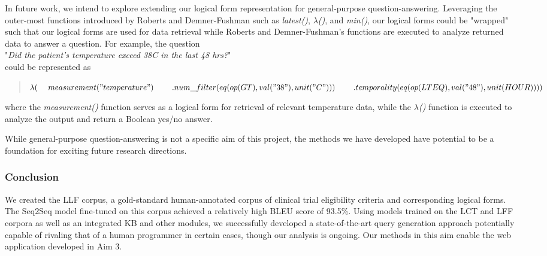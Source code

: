 \documentclass[../main.tex]{subfiles}
\begin{document}
In future work, we intend to explore extending our logical form representation for general-purpose question-answering. Leveraging the outer-most functions introduced by Roberts and Demner-Fushman such as \textit{latest()}, $\lambda$\textit{()}, and \textit{min()}, our logical forms could be "wrapped" such that our logical forms are used for data retrieval while Roberts and Demner-Fushman's functions are executed to analyze returned data to answer a question. For example, the question \\

"\textit{Did the patient’s temperature exceed 38C in the last 48 hrs?}" \\

\noindent could be represented as

\begin{quote}
$\lambda( \\
    \mathrm{\ \ \ \ }measurement("temperature") \\
    \mathrm{\ \ \ \ \ \ \ }.num\_filter(eq(op(GT), val("38"), unit("C")))\\
    \mathrm{\ \ \ \ \ \ \ }.temporality(eq(op(LTEQ), val("48"), unit(HOUR))) \\
)$
\end{quote}

\noindent where the \textit{measurement()} function serves as a logical form for retrieval of relevant temperature data, while the $\lambda$\textit{()} function is executed to analyze the output and return a Boolean yes/no answer.

While general-purpose question-answering is not a specific aim of this project, the methods we have developed have potential to be a foundation for exciting future research directions. 

\subsubsection{Conclusion}

We created the LLF corpus, a gold-standard human-annotated corpus of clinical trial eligibility criteria and corresponding logical forms. The Seq2Seq model fine-tuned on this corpus achieved a relatively high BLEU score of 93.5\%. Using models trained on the LCT and LFF corpora as well as an integrated KB and other modules, we successfully developed a state-of-the-art query generation approach potentially capable of rivaling that of a human programmer in certain cases, though our analysis is ongoing. Our methods in this aim enable the web application developed in Aim 3.
\end{document}
